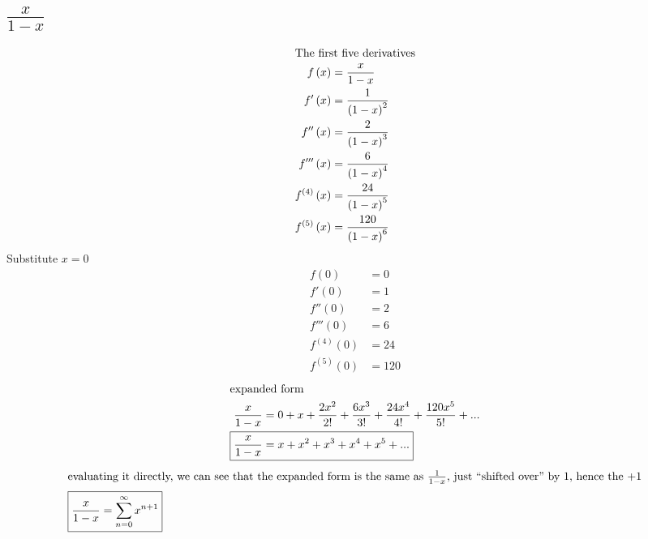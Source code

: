 \documentclass[12pt]{article}
\begin{document}
\section{\texorpdfstring{$\frac{x}{1-x}$}{Lg}}
\begin{align}
  \intertext{The first five derivatives}
  f\left(x\right)                  & =\frac{x}{1-x}                                                                      \\
  f'\left(x\right)                 & =\frac{1}{\left(1-x\right)^{2}}                                                     \\
  f''\left(x\right)                & =\frac{2}{\left(1-x\right)^{3}}                                                     \\
  f'''\left(x\right)               & =\frac{6}{\left(1-x\right)^{4}}                                                     \\
  f^{\left(4\right)}\left(x\right) & =\frac{24}{\left(1-x\right)^{5}}                                                    \\
  f^{\left(5\right)}\left(x\right) & =\frac{120}{\left(1-x\right)^{6}}                                                   \\
\end{align}
Substitute $x=0$
\begin{align}
  f\left(0\right)                  & =0                                                                                  \\
  f'\left(0\right)                 & =1                                                                                  \\
  f''\left(0\right)                & =2                                                                                  \\
  f'''\left(0\right)               & =6                                                                                  \\
  f^{\left(4\right)}\left(0\right) & =24                                                                                 \\
  f^{\left(5\right)}\left(0\right) & =120                                                                                
\end{align}
\begin{align}
  \intertext{expanded form}
  \frac{x}{1-x}                    & =0+x+\frac{2x^{2}}{2!}+\frac{6x^{3}}{3!}+\frac{24x^{4}}{4!}+\frac{120x^{5}}{5!}+... \\
  \Aboxed{\frac{x}{1-x}                    & =x+x^{2}+x^{3}+x^{4}+x^{5}+...}
\end{align}
\begin{align}
  \intertext{evaluating it directly, we can see that the expanded form is the same as $\frac{1}{1-x}$, just ``shifted over'' by 1, hence the $+1$}
  \Aboxed{\frac{x}{1-x}                    & =\sum_{n=0}^{\infty}x^{n+1}}
\end{align}
\end{document}
